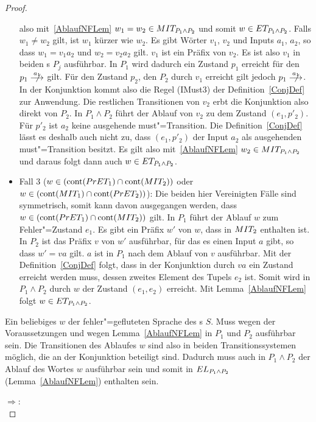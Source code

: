 \begin{proof}
\begin{itemize}
      also mit~\ref{AblaufNFLem} $w_1=w_2\in MIT _{P_1\land P_2}$ und somit
      $w\in ET _{P_1\land P_2}$. Falls $w_1\neq w_2$ gilt, ist \oBdA{} $w_1$
      kürzer wie $w_2$. Es gibt Wörter $v_1$, $v_2$ und Inputs $a_1$, $a_2$, so
      dass $w_1=v_1a_2$ und $w_2=v_2a_2$ gilt. $v_1$ ist ein Präfix von $v_2$.
      Es ist also $v_1$ in beiden \MEIO{}s $P_j$ ausführbar. In $P_1$ wird
      dadurch ein Zustand $p_1$ erreicht für den $p_1\nmust[a_1]$ gilt. Für den
      Zustand $p_2$, den $P_2$ durch $v_1$ erreicht gilt jedoch
      $p_1\nmust[a_1]$. In der Konjunktion kommt also die Regel (IMust3) der
      Definition~\ref{ConjDef} zur Anwendung. Die restlichen Transitionen von
      $v_2$ erbt die Konjunktion also direkt von $P_2$. In $P_1\land P_2$ führt
      der Ablauf von $v_2$ zu dem Zustand $(e_1,p'_2)$. Für $p'_2$ ist $a_2$
      keine ausgehende must"=Transition. Die Definition~\ref{ConjDef} lässt es
      deshalb auch nicht zu, dass $(e_1,p'_2)$ der Input $a_2$ als ausgehenden
      must"=Transition besitzt. Es gilt also mit~\ref{AblaufNFLem} $w_2\in MIT
      _{P_1\land P_2}$ und daraus folgt dann auch $w\in ET _{P_1\land P_2}$.
    \item Fall 3 ($w\in (\mathrm{cont} (PrET _1)\cap \mathrm{cont} (MIT _2))$ oder $w\in
      (\mathrm{cont} (MIT _1)\cap \mathrm{cont} (PrET _2))$): Die beiden hier Vereinigten
      Fälle sind symmetrisch, somit kann \oBdA{} davon ausgegangen werden, dass
      $w\in (\mathrm{cont} (PrET _1)\cap \mathrm{cont} (MIT _2))$ gilt. In $P_1$ führt der
      Ablauf $w$ zum Fehler"=Zustand $e_1$. Es gibt ein Präfix $w'$ von $w$,
      dass in $MIT _2$ enthalten ist. In $P_2$ ist das Präfix $v$ von $w'$
      ausführbar, für das es einen Input $a$ gibt, so dass $w'=va$ gilt. $a$
      ist in $P_1$ nach dem Ablauf von $v$ ausführbar. Mit der
      Definition~\ref{ConjDef} folgt, dass in der Konjunktion durch $va$ ein
      Zustand erreicht werden muss, dessen zweites Element des Tupels $e_2$
      ist. Somit wird in $P_1\land P_2$ durch $w$ der Zustand $(e_1,e_2)$
      erreicht. Mit Lemma~\ref{AblaufNFLem} folgt $w\in ET _{P_1\land P_2}$.
  \end{itemize}
  Ein beliebiges $w$ der fehler"=gefluteten Sprache des \MEIO{}s $S$. Muss
  wegen der Voraussetzungen und wegen Lemma~\ref{AblaufNFLem} in $P_1$ und
  $P_2$ ausführbar sein. Die Transitionen des Ablaufes $w$ sind also in beiden
  Transitionssystemen möglich, die an der Konjunktion beteiligt sind. Dadurch
  muss auch in $P_1\land P_2$ der Ablauf des Wortes $w$ ausführbar sein und
  somit in $EL _{P_1\land P_2}$ (Lemma~\ref{AblaufNFLem}) enthalten sein.

  \glqq $\Rightarrow$\grqq{}:\\
\end{proof}
